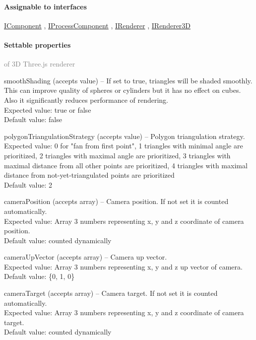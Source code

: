	\paragraph{Assignable to interfaces}
		\hyperref[Malsys.Processing.Components.IComponent]{IComponent}%
, 		\hyperref[Malsys.Processing.Components.IProcessComponent]{IProcessComponent}%
, 		\hyperref[Malsys.Processing.Components.IRenderer]{IRenderer}%
, 		\hyperref[Malsys.Processing.Components.Renderers.IRenderer3D]{IRenderer3D}%
	\paragraph{Settable properties}\textcolor{gray}{of 3D Three.js renderer}
	\begin{description*}
		\item[smoothShading]
		(accepts value)
			-- If set to true, triangles will be shaded smoothly.
            This can improve quality of spheres or cylinders but it has no effect on cubes.
            Also it significantly reduces performance of rendering.
			\\ Expected value: true or false
			\\ Default value: false
		\item[polygonTriangulationStrategy]
		(accepts value)
			-- Polygon triangulation strategy.
			\\ Expected value: 0 for "fan from first point",
            1 triangles with minimal angle are prioritized,
            2 triangles with maximal angle are prioritized,
            3 triangles with maximal distance from all other points are prioritized,
            4 triangles with maximal distance from not-yet-triangulated points are prioritized
			\\ Default value: 2
		\item[cameraPosition]
		(accepts array)
			-- Camera position. If not set it is counted automatically.
			\\ Expected value: Array 3 numbers representing x, y and z coordinate of camera position.
			\\ Default value: counted dynamically
		\item[cameraUpVector]
		(accepts array)
			-- Camera up vector.
			\\ Expected value: Array 3 numbers representing x, y and z up vector of camera.
			\\ Default value: \{0, 1, 0\}
		\item[cameraTarget]
		(accepts array)
			-- Camera target. If not set it is counted automatically.
			\\ Expected value: Array 3 numbers representing x, y and z coordinate of camera target.
			\\ Default value: counted dynamically
	\end{description*}
	
